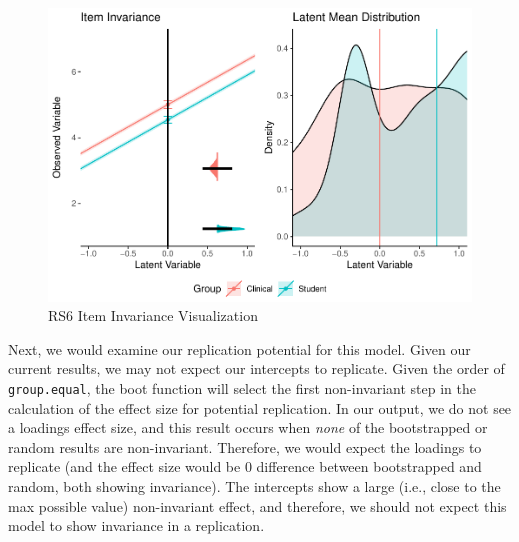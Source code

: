 \documentclass[
  man]{apa7}
\newenvironment{Shaded}{\begin{snugshade}}{\end{snugshade}}
\newcommand{\AttributeTok}[1]{\textcolor[rgb]{0.13,0.29,0.53}{#1}}
\newcommand{\DecValTok}[1]{\textcolor[rgb]{0.00,0.00,0.81}{#1}}
\newcommand{\FunctionTok}[1]{\textcolor[rgb]{0.13,0.29,0.53}{\textbf{#1}}}
\newcommand{\NormalTok}[1]{#1}
\newcommand{\OtherTok}[1]{\textcolor[rgb]{0.56,0.35,0.01}{#1}}
\newcommand{\SpecialCharTok}[1]{\textcolor[rgb]{0.81,0.36,0.00}{\textbf{#1}}}
\newcommand{\StringTok}[1]{\textcolor[rgb]{0.31,0.60,0.02}{#1}}
\begin{document}
\begin{figure}
\centering
\includegraphics{manuscript_files/figure-latex/rs6-img-1.pdf}
\caption{\label{fig:rs6-img}RS6 Item Invariance Visualization}
\end{figure}

Next, we would examine our replication potential for this model. Given our current results, we may not expect our intercepts to replicate. Given the order of \texttt{group.equal}, the boot function will select the first non-invariant step in the calculation of the effect size for potential replication. In our output, we do not see a loadings effect size, and this result occurs when \emph{none} of the bootstrapped or random results are non-invariant. Therefore, we would expect the loadings to replicate (and the effect size would be 0 difference between bootstrapped and random, both showing invariance). The intercepts show a large (i.e., close to the max possible value) non-invariant effect, and therefore, we should not expect this model to show invariance in a replication.

\normalsize

\begin{Shaded}
\end{Shaded}
\end{document}
